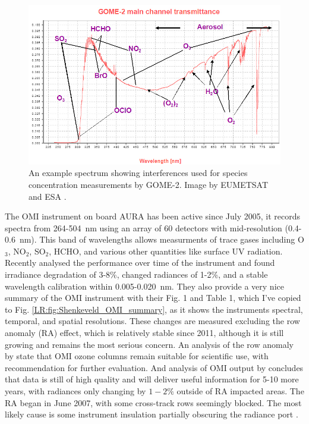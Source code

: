     \begin{figure}
      \includegraphics[width=\textwidth]{Figures/GOME_SPECTRUM.jpg}
      \caption{An example spectrum showing interferences used for species concentration measurements by GOME-2. Image by EUMETSAT and ESA \citep{GOME2Image}.}
      \label{LR:fig:gomeproducts}
    \end{figure}
    
    The OMI instrument on board AURA has been active since July 2005, it records spectra from 264-504~nm using an array of 60 detectors with mid-resolution (0.4-0.6~nm).
    This band of wavelengths allows measurments of trace gases including O$_3$, NO$_2$, SO$_2$, HCHO, and various other quantities like surface UV radiation.
    Recently \cite{Schenkeveld2017} analysed the performance over time of the instrument and found irradiance degradation of 3-8\%, changed radiances of 1-2\%, and a stable wavelength calibration within 0.005-0.020~nm.
    They also provide a very nice summary of the OMI instrument with their Fig. 1 and Table 1, which I've copied to Fig. \ref{LR:fig:Shenkeveld_OMI_summary}, as it shows the instruments spectral, temporal, and spatial resolutions.
    These changes are measured excluding the row anomaly (RA) effect, which is relatively stable since 2011, although it is still growing and remains the most serious concern.
    An analysis of the row anomaly by \cite{Huang2017} state that OMI ozone columns remain suitable for scientific use, with recommendation for further evaluation.
    And analysis of OMI output by \cite{Schenkeveld2017} concludes that data is still of high quality and will deliver useful information for 5-10 more years, with radiances only changing by $1-2\%$ outside of RA impacted areas.
    The RA began in June 2007, with some cross-track rows seemingly blocked. The most likely cause is some instrument insulation partially obscuring the radiance port \citep{Schenkeveld2017}.
    
